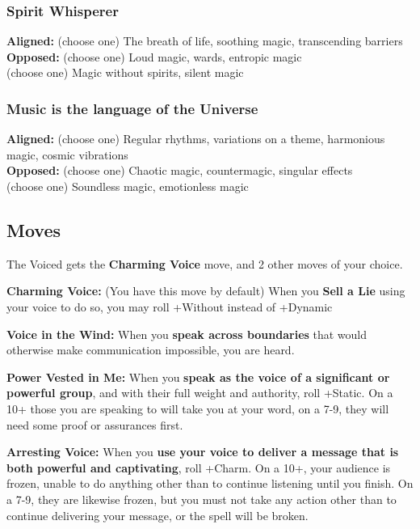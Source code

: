 \documentclass[
]{memoir}
\begin{document}
\hypertarget{spirit-whisperer}{%
\subsubsection{Spirit Whisperer}\label{spirit-whisperer}}

\textbf{Aligned:} (choose one) The breath of life, soothing magic,
transcending barriers\\
\textbf{Opposed:} (choose one) Loud magic, wards, entropic magic\\
(choose one) Magic without spirits, silent magic

\hypertarget{music-is-the-language-of-the-universe}{%
\subsubsection{Music is the language of the
Universe}\label{music-is-the-language-of-the-universe}}

\textbf{Aligned:} (choose one) Regular rhythms, variations on a theme,
harmonious magic, cosmic vibrations\\
\textbf{Opposed:} (choose one) Chaotic magic, countermagic, singular
effects\\
(choose one) Soundless magic, emotionless magic

\hypertarget{moves-7}{%
\subsection{Moves}\label{moves-7}}

The Voiced gets the \textbf{Charming Voice} move, and 2 other moves of
your choice.

\textbf{Charming Voice:} (You have this move by default) When you
\textbf{Sell a Lie} using your voice to do so, you may roll +Without
instead of +Dynamic

\textbf{Voice in the Wind:} When you \textbf{speak across boundaries}
that would otherwise make communication impossible, you are heard.

\textbf{Power Vested in Me:} When you \textbf{speak as the voice of a
significant or powerful group}, and with their full weight and
authority, roll +Static. On a 10+ those you are speaking to will take
you at your word, on a 7-9, they will need some proof or assurances
first.

\textbf{Arresting Voice:} When you \textbf{use your voice to deliver a
message that is both powerful and captivating}, roll +Charm. On a 10+,
your audience is frozen, unable to do anything other than to continue
listening until you finish. On a 7-9, they are likewise frozen, but you
must not take any action other than to continue delivering your message,
or the spell will be broken.
\end{document}
